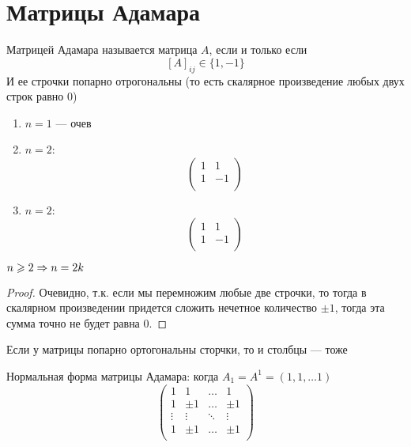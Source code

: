 
\section{Матрицы Адамара}
\begin{definition}
    Матрицей Адамара называется матрица \(A\), если и только если 
    \[[A]_{ij} \in \{1, -1\}\]
    И ее строчки попарно отрогональны (то есть скалярное произведение любых двух строк равно 0)
\end{definition}

\begin{example}
    \begin{enumerate}
        \item \(n = 1\) --- очев
        \item \(n = 2\):
        \[\left(\begin{array}{ccc}
            1 & 1 \\
            1 & -1 \\
        \end{array}\right)\]
        \item \(n = 2\):
        \[\left(\begin{array}{ccc}
            1 & 1 \\
            1 & -1 \\
        \end{array}\right)\]
    \end{enumerate}
\end{example}
\begin{note}
    \(n \geqslant 2 \Rightarrow n = 2k\)
\end{note}
\begin{proof}
    Очевидно, т.к. если мы перемножим любые две строчки, то тогда в скалярном произведении придется сложить нечетное количество \(\pm 1\), тогда эта сумма точно не будет равна 0.
\end{proof}
\begin{proposition}
    Если у матрицы попарно ортогональны сторчки, то и столбцы --- тоже
\end{proposition}
\begin{definition}
    Нормальная форма матрицы Адамара: когда \(A_1 = A^1 = (1, 1, \dots 1)\)
    \[\left(\begin{array}{cccc}
        1 & 1 & \dots &  1 \\
        1 & \pm 1 & \dots & \pm 1 \\
        \vdots & \vdots & \ddots & \vdots\\
        1 & \pm 1 & \dots & \pm 1 \\
    \end{array}\right)\]
\end{definition}
